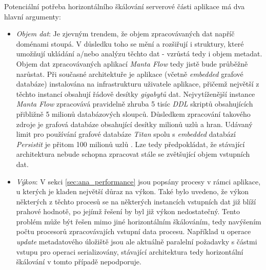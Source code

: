 Potenciální potřeba horizontálního škálování serverové části aplikace má dva hlavní argumenty:

\begin{itemize}
	\item{\textit{Objem dat}}: Je zjevným trendem, že objem zpracovávaných dat napříč doménami stoupá. V důsledku toho se mění a rozšiřují i struktury, které umožňují ukládání a/nebo analýzu těchto dat - vzrůstá tedy i objem metadat. Objem dat zpracovávaných aplikací \textit{Manta Flow} tedy jistě bude průběžně narůstat. Při současné architektuře je aplikace (včetně \textit{embedded} grafové databáze) instalována na infrastrukturu uživatele aplikace, přičemž největší z těchto instancí obsahují řádově desítky \textit{gigabytů} dat. Nejvytíženější instance \textit{Manta Flow} zpracovává pravidelně zhruba 5 tisíc \textit{DDL} skriptů obsahujících přibližně 5 milionů databázových sloupců. Důsledkem zpracování takového zdroje je grafová databáze obsahující desítky milionů uzlů a hran. Udávaný limit pro používání grafové databáze \textit{Titan} spolu s \textit{embedded} databází \textit{Persistit} je přitom 100 milionů uzlů \cite{TitanPersistit04}. Lze tedy předpokládat, že stávající architektura nebude schopna zpracovat stále se zvětšující objem vstupních dat.

	\item{\textit{Výkon}}: V sekci \ref{sec:ana_performance} jsou popsány procesy v rámci aplikace, u kterých je kladen největší důraz na výkon. Také bylo uvedeno, že výkon některých z těchto procesů se na některých instancích vstupních dat již blíží prahové hodnotě, po jejímž řešení by byl již výkon nedostatečný. Tento problém může být řešen mimo jiné horizontálním škálováním, tedy navýšením počtu procesorů zpracovávajích vstupní data procesu. Například u operace \textit{update} metadatového úložiště jsou ale aktuálně paralelní požadavky s částmi vstupu pro operaci serializovány, stávající architektura tedy horizontální škálování v tomto případě nepodporuje.
\end{itemize}


